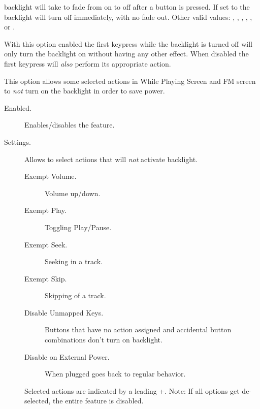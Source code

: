 \begin{description}
\begin{description}
{{        backlight will take to fade from on to off after a button is pressed. If
        set to  the backlight will turn off immediately, with no
        fade out. Other valid values: , ,
        , , ,  or
        .
      }
      \item[First Keypress Enables Backlight Only.]
      With this option enabled the first keypress while the backlight is turned
      off will only turn the backlight on without having any other effect. When
      disabled the first keypress will \emph{also} perform its appropriate action.

      \item[Backlight Exemptions]
       This option allows some selected actions in While Playing Screen and
       FM screen to \emph{not} turn on the backlight in order to save power.
      \begin{description}
        \item[Enabled.]
        Enables/disables the feature.

        \item[Settings.]
        Allows to select actions that will \emph{not} activate backlight.
                \begin{description}
                \item[Exempt Volume.]
                Volume up/down.
                \item[Exempt Play.]
                Toggling Play/Pause.
                \item[Exempt Seek.]
                Seeking in a track.
                \item[Exempt Skip.]
                Skipping of a track.
                \item[Disable Unmapped Keys.]
                Buttons that have no action assigned and accidental button
                    combinations don't turn on backlight.
                \item[Disable on External Power.]
                When plugged goes back to regular behavior.
                \end{description}
        Selected actions are indicated by a leading +.
        Note: If all options get de-selected, the entire feature is disabled.
        \end{description}



}
\end{description}
\end{description}
